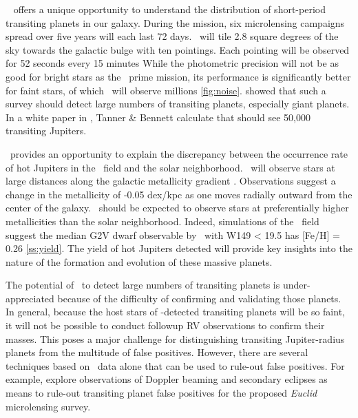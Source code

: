 \WF\ \citep{Spergel15} offers a unique opportunity to understand the distribution
of short-period transiting planets in our
galaxy.
During the mission,
six microlensing campaigns spread over five years will each last 72 days.
\WF\ will tile 2.8 square degrees of the sky
towards the galactic bulge with ten pointings.
Each pointing will be observed for 52 seconds every 15 minutes
While the photometric precision will not be as good for bright
stars as the \kep\ prime mission, its performance is significantly
better for faint stars, of which \WF\, will observe millions
\ref{fig:noise}. \citet{BennettRhie02} showed that such a survey
should detect large numbers of transiting planets, especially giant
planets.
In a white paper in \citet{Spergel15}, Tanner \& Bennett calculate that \WF should see
50,000 transiting Jupiters.

\WF\ provides an opportunity to explain the discrepancy between the occurrence rate of hot Jupiters
in the \kep\ field and the solar neighborhood. 
\WF\ will observe stars at large distances along the galactic 
metallicity gradient \citep{Rolleston00, Pedicelli09}. 
Observations suggest a change in the metallicity of -0.05 dex/kpc as one moves
radially outward from the center of the galaxy.
\WF\ should be expected to observe stars at preferentially higher metallicities than
the solar neighborhood.
Indeed, simulations of the \WF\ field suggest the median G2V dwarf observable by \WF\ with W149 < 19.5 has
[Fe/H] = 0.26 \ref{ss:yield}.
The yield of hot Jupiters detected will provide key insights into the nature of the
formation and evolution of these massive planets.

The potential of \WF\, to detect large numbers of transiting planets
is under-appreciated because of the difficulty of confirming and
validating those planets. In general, because the host stars of
\WF-detected transiting planets will be so faint, it will not be
possible to conduct followup RV observations to confirm their
masses. This poses a major challenge for distinguishing transiting
Jupiter-radius planets from the multitude of false positives. However,
there are several techniques based on \WF\, data alone that can be
used to rule-out false positives. For example, \citet{McDonald14}
explore observations of Doppler beaming and secondary eclipses
as means to rule-out
transiting planet false positives for the proposed \textit{Euclid}
microlensing survey.

